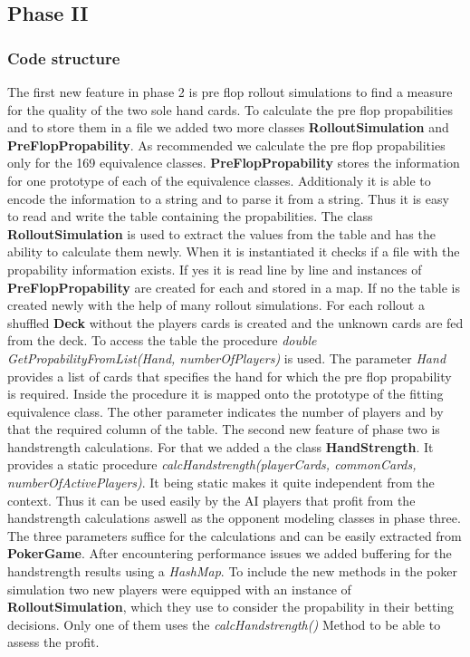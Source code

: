 \subsection{Phase II}

\subsubsection{Code structure}
The first new feature in phase 2 is pre flop rollout simulations to find a measure for the quality of the two sole hand cards.
To calculate the pre flop propabilities and to store them in a file we added two more classes \textbf{RolloutSimulation} and \textbf{PreFlopPropability}. As recommended we calculate the pre flop propabilities only for the 169 equivalence classes. \textbf{PreFlopPropability} stores the information for one prototype of each of the equivalence classes. Additionaly it is able to encode the information to a string and to parse it from a string. Thus it is easy to read and write the table containing the propabilities. 
The class \textbf{RolloutSimulation} is used to extract the values from the table and has the ability to calculate them newly. When it is instantiated it checks if a file with the propability information exists. If yes it is read line by line and instances of \textbf{PreFlopPropability} are created for each and stored in a map. If no the table is created newly with the help of many rollout simulations. For each rollout a shuffled \textbf{Deck} without the players cards is created and the unknown cards are fed from the deck. To access the table the procedure \textit{double GetPropabilityFromList(Hand, numberOfPlayers)} is used. The parameter \textit{Hand} provides a list of cards that specifies the hand for which the pre flop propability is required. Inside the procedure it is mapped onto the prototype of the fitting equivalence class. The other parameter indicates the number of players and by that the required column of the table.
The second new feature of phase two is handstrength calculations. For that we added a the class \textbf{HandStrength}. It provides a static procedure \textit{calcHandstrength(playerCards, commonCards, numberOfActivePlayers)}. It being static makes it quite independent from the context. Thus it can be used easily by the AI players that profit from the handstrength calculations aswell as the opponent modeling classes in phase three. The three parameters suffice for the calculations and can be easily extracted from \textbf{PokerGame}. After encountering performance issues we added buffering for the handstrength results using a \textit{HashMap}.
To include the new methods in the poker simulation two new players were equipped with an instance of \textbf{RolloutSimulation}, which they use to consider the propability in their betting decisions. Only one of them uses the \textit{calcHandstrength()} Method to be able to assess the profit.


